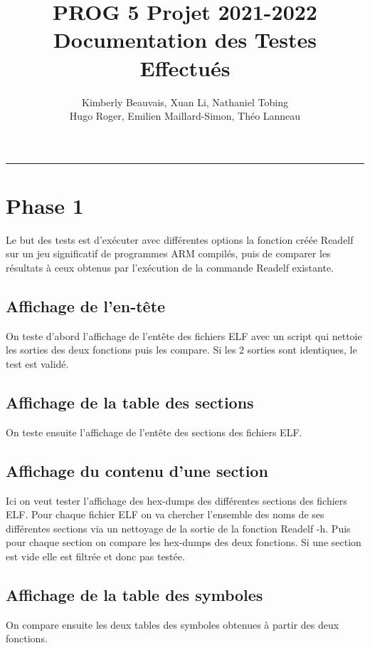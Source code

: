 \documentclass[a4paper]{article} %
\title{PROG 5 Projet 2021-2022 \\
\large Documentation des Testes Effectués}
\author{Kimberly Beauvais, Xuan Li, Nathaniel Tobing \\
Hugo Roger, Emilien Maillard-Simon, Théo Lanneau}
\begin{document}
\maketitle
\begin{center}
\rule{\textwidth}{1pt}
\end{center}

\renewcommand{\contentsname}{Table des Matières}
\tableofcontents

\section{Phase 1}
Le but des tests est d’exécuter avec différentes options la fonction créée 
Readelf sur un jeu significatif de programmes ARM compilés, puis de comparer 
les résultats à ceux obtenus par l’exécution de la commande Readelf existante.


\subsection{Affichage de l’en-tête}
On teste d’abord l’affichage de l’entête des fichiers ELF avec un script qui 
nettoie les sorties des deux fonctions puis les compare. Si les 2 sorties sont 
identiques, le test est validé.

\subsection{Affichage de la table des sections}
On teste ensuite l’affichage de l’entête des sections des fichiers ELF.

\subsection{Affichage du contenu d'une section}
Ici on veut tester l’affichage des hex-dumps des différentes sections des 
fichiers ELF. Pour chaque fichier ELF on va chercher l’ensemble des noms de 
ses différentes sections via un nettoyage de la sortie de la fonction Readelf -h.
Puis pour chaque section on compare les hex-dumps des deux fonctions.
Si une section est vide elle est filtrée et donc pas testée.


\subsection{Affichage de la table des symboles}
On compare ensuite les deux tables des symboles obtenues à partir des deux 
fonctions.
\end{document}
